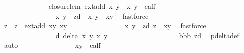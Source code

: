 \begin{isabellebody}
\isanewline
\ \ \ \ \ \ \ \ \ \ \ \ \isamarkupfalse%
\ closure{\isacharunderscore}lem{\isacharcolon}\ {\isachardoublequoteopen}ext{\isacharunderscore}add\ {\isacharparenleft}x{\isacharcomma}\ y{\isacharparenright}\ {\isacharparenleft}{\isasymtau}\ {\isacharparenleft}x{\isacharprime}{\isacharcomma}\ y{\isacharprime}{\isacharparenright}{\isacharparenright}\ {\isasymin}\ e{\isacharunderscore}aff{\isachardoublequoteclose}\isanewline
\ \ \ \ \ \ \ \ \ \ \ \ \isamarkupfalse%
\ {\isacharminus}\isanewline
\ \ \ \ \ \ \ \ \ \ \ \ \ \ \isamarkupfalse%
\ x{}\ y{}\ \ z{}{\isacharunderscore}d{\isacharcolon}\ {\isachardoublequoteopen}{\isasymtau}\ {\isacharparenleft}x{\isacharprime}{\isacharcomma}\ y{\isacharprime}{\isacharparenright}\ {\isacharequal}\ {\isacharparenleft}x{}{\isacharcomma}y{}{\isacharparenright}{\isachardoublequoteclose}\ \isamarkupfalse%
\ fastforce\isanewline
\ \ \ \ \ \ \ \ \ \ \ \ \ \ \isamarkupfalse%
\ z{}\ \ {\isachardoublequoteopen}z{}\ {\isacharequal}\ ext{\isacharunderscore}add\ {\isacharparenleft}x{\isacharcomma}y{\isacharparenright}\ {\isacharparenleft}x{}{\isacharcomma}y{}{\isacharparenright}{\isachardoublequoteclose}\isanewline
\ \ \ \ \ \ \ \ \ \ \ \ \ \ \isamarkupfalse%
\ x{}\ y{}\ \ z{}{\isacharunderscore}d{\isacharcolon}\ {\isachardoublequoteopen}z{}\ {\isacharequal}\ {\isacharparenleft}x{}{\isacharcomma}y{}{\isacharparenright}{\isachardoublequoteclose}\ \isamarkupfalse%
\ fastforce\isanewline
\ \ \ \ \ \ \ \ \ \ \ \ \ \ \isamarkupfalse%
\ d{\isacharprime}{\isacharcolon}\ {\isachardoublequoteopen}delta{\isacharprime}\ x\ y\ x{}\ y{}\ {\isasymnoteq}\ {}{\isachardoublequoteclose}\isanewline
\ \ \ \ \ \ \ \ \ \ \ \ \ \ \ \ \isamarkupfalse%
\ bbb\ z{}{\isacharunderscore}d\ \isamarkupfalse%
\ p{\isacharunderscore}delta{\isacharprime}{\isacharunderscore}def\ \isamarkupfalse%
\ auto\isanewline
\ \ \ \ \ \ \ \ \ \ \ \ \ \ \isamarkupfalse%
\ {\isachardoublequoteopen}{\isacharparenleft}x{}{\isacharcomma}y{}{\isacharparenright}\ {\isasymin}\ e{\isacharunderscore}aff{\isachardoublequoteclose}\isanewline
\ \ \ \ \ \ \ \ \ \ \ \ \ \ \ \ \isamarkupfalse%

\end{isabellebody}
